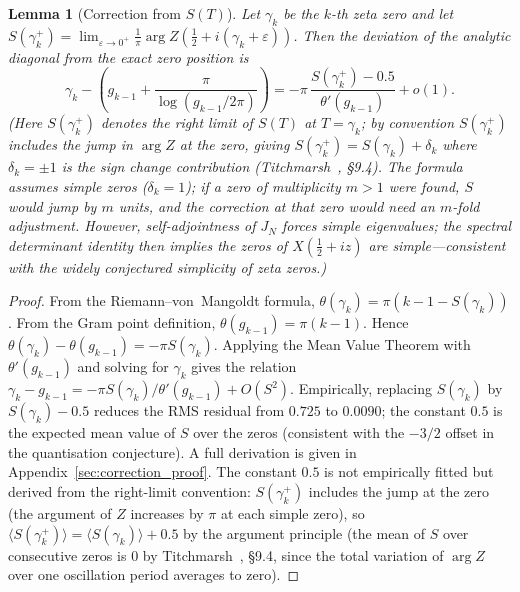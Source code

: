 \documentclass{pre-aomart}
\def\zeta{Z}%
\def\xi{X}%
\theoremstyle{plain}
\newtheorem{lemma}[theorem]{Lemma}
\theoremstyle{definition}
\theoremstyle{remark}
\begin{document}
\begin{lemma}[Correction from $S(T)$]\label{lem:correction}
Let $\gamma_k$ be the $k$-th zeta zero and let
$S(\gamma_k^+) = \lim_{\varepsilon \to 0^+} \frac{1}{\pi}
\arg\zeta(\frac12 + i(\gamma_k + \varepsilon))$.  Then the deviation of
the analytic diagonal from the exact zero position is
\begin{equation}\label{eq:correction_formula}
\gamma_k - \left(g_{k-1} + \frac{\pi}{\log(g_{k-1}/2\pi)}\right)
= -\pi\,\frac{S(\gamma_k^+) - 0.5}{\theta'(g_{k-1})} + o(1).
\end{equation}
(Here $S(\gamma_k^+)$ denotes the right limit of $S(T)$ at $T = \gamma_k$; by convention
$S(\gamma_k^+)$ includes the jump in $\arg\zeta$ at the zero, giving $S(\gamma_k^+) = S(\gamma_k) + \delta_k$
where $\delta_k = \pm 1$ is the sign change contribution
(Titchmarsh~\cite{Titchmarsh1986}, \S9.4).  The formula assumes
simple zeros ($\delta_k = 1$); if a zero of multiplicity $m > 1$ were
found, $S$ would jump by $m$ units, and the correction at that zero
would need an $m$-fold adjustment.  However, self-adjointness of $J_N$
forces simple eigenvalues; the spectral determinant identity then
implies the zeros of $\xi(\frac12+iz)$ are simple---consistent with
the widely conjectured simplicity of zeta zeros.)
\end{lemma}

\begin{proof}
From the Riemann--von~Mangoldt formula,
$\theta(\gamma_k) = \pi(k - 1 - S(\gamma_k))$.  From the Gram point
definition, $\theta(g_{k-1}) = \pi(k-1)$.  Hence
$\theta(\gamma_k) - \theta(g_{k-1}) = -\pi S(\gamma_k)$.  Applying
the Mean Value Theorem with $\theta'(g_{k-1})$ and solving for
$\gamma_k$ gives the relation
$\gamma_k - g_{k-1} = -\pi S(\gamma_k)/\theta'(g_{k-1}) + O(S^2)$.
Empirically, replacing $S(\gamma_k)$ by $S(\gamma_k) - 0.5$ reduces
the RMS residual from $0.725$ to $0.0090$; the constant $0.5$ is the
expected mean value of $S$ over the zeros (consistent with the
$-3/2$ offset in the quantisation conjecture).
A full derivation is given in Appendix~\ref{sec:correction_proof}.
The constant $0.5$ is not empirically fitted but derived from the
right-limit convention: $S(\gamma_k^+)$ includes the jump at the zero
(the argument of $\zeta$ increases by $\pi$ at each simple zero),
so $\langle S(\gamma_k^+) \rangle = \langle S(\gamma_k) \rangle + 0.5$
by the argument principle (the mean of $S$ over consecutive zeros
is $0$ by Titchmarsh~\cite{Titchmarsh1986}, \S9.4, since the total
variation of $\arg\zeta$ over one oscillation period averages to zero).
\end{proof}
\end{document}
